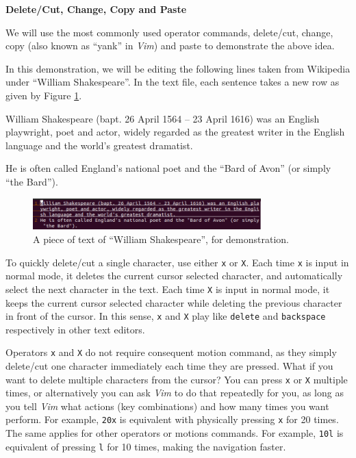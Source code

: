 \vspace{0.1in}
\noindent \textbf{Delete/Cut, Change, Copy and Paste}
\vspace{0.1in}

We will use the most commonly used operator commands, delete/cut, change, copy (also known as ``yank'' in \textit{Vim}) and paste to demonstrate the above idea.

In this demonstration, we will be editing the following lines taken from Wikipedia under ``William Shakespeare''. In the text file, each sentence takes a new row as given by Figure \ref{ch3fig:vimdemo1}.

\begin{shortbox}
William Shakespeare (bapt. 26 April 1564 – 23 April 1616) was an English playwright, poet and actor, widely regarded as the greatest writer in the English language and the world's greatest dramatist.

He is often called England's national poet and the ``Bard of Avon'' (or simply ``the Bard'').
\end{shortbox}

\begin{figure}
\centering
\includegraphics[width=250pt]{chapters/chapter3/figures/vimdemo1.png}
\caption{A piece of text of ``William Shakespeare'', for demonstration.} \label{ch3fig:vimdemo1}
\end{figure}

To quickly delete/cut a single character, use either \verb|x| or \verb|X|. Each time \verb|x| is input in normal mode, it deletes the current cursor selected character, and automatically select the next character in the text. Each time \verb|X| is input in normal mode, it keeps the current cursor selected character while deleting the previous character in front of the cursor. In this sense, \verb|x| and \verb|X| play like \verb|delete| and \verb|backspace| respectively in other text editors.

Operators \verb|x| and \verb|X| do not require consequent motion command, as they simply delete/cut one character immediately each time they are pressed. What if you want to delete multiple characters from the cursor? You can press \verb|x| or \verb|X| multiple times, or alternatively you can ask \textit{Vim} to do that repeatedly for you, as long as you tell \textit{Vim} what actions (key combinations) and how many times you want perform. For example, \verb|20x| is equivalent with physically pressing \verb|x| for 20 times. The same applies for other operators or motions commands. For example, \verb|10l| is equivalent of pressing \verb|l| for 10 times, making the navigation faster.

